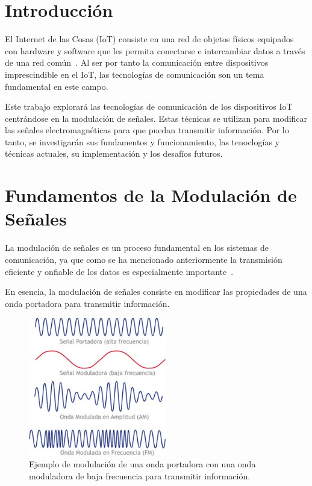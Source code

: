 \documentclass[12pt, letterpaper]{article}
\title{\doctitle}
\author{Juan Luis Serradilla Tormos}
\date{\monthname[\month] de \the\year}
\begin{document}
\pagestyle{fancy}

\maketitle

\newpage
\tableofcontents

\newpage
\section{Introducción}
El Internet de las Cosas (IoT) consiste en una red de objetos físicos equipados con hardware y software que les permita conectarse e intercambiar datos a través de una red común~\cite{IoT-Oracle}. Al ser por tanto la comunicación entre dispositivos imprescindible en el IoT, las tecnologías de comunicación son un tema fundamental en este campo.

Este trabajo explorará las tecnologías de comunicación de los dispositivos IoT centrándose en la modulación de señales. Estas técnicas se utilizan para modificar las señales electromagnéticas para que puedan transmitir información. Por lo tanto, se investigarán sus fundamentos y funcionamiento, las tenoclogías y técnicas actuales, su implementación y los desafíos futuros.


\vspace{1em}
\section{Fundamentos de la Modulación de Señales}

La modulación de señales es un proceso fundamental en los sistemas de comunicación, ya que como se ha mencionado anteriormente la transmisión eficiente y onfiable de los datos es especialmente importante~\cite{modulacion-avsystem}.

En esencia, la modulación de señales consiste en modificar las propiedades de una onda portadora para transmitir información. 

\newpage
\begin{figure}[h]
    \centering
    \includegraphics[width=6cm]{images/modulacion_ejemplo.jpg}
    \caption{Ejemplo de modulación de una onda portadora con una onda moduladora de baja frecuencia para transmitir información.}\label{fig:modulacion_ejemplo}
\end{figure}
\end{document}

